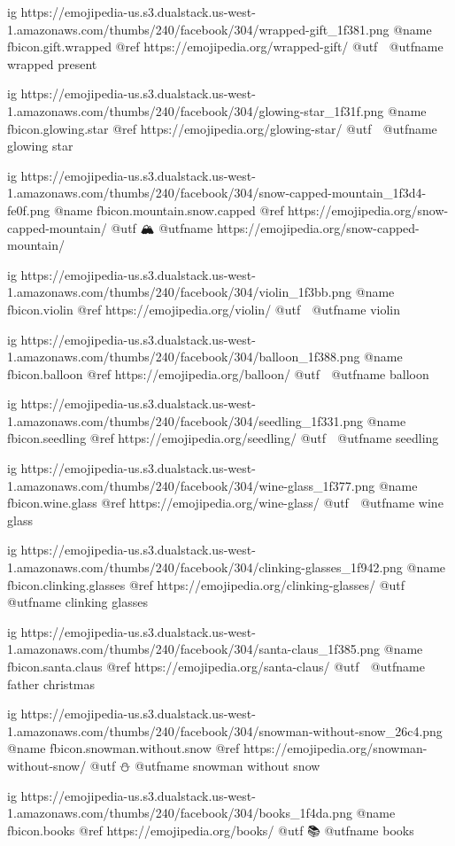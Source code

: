 	ig https://emojipedia-us.s3.dualstack.us-west-1.amazonaws.com/thumbs/240/facebook/304/wrapped-gift_1f381.png
	@name fbicon.gift.wrapped
	@ref https://emojipedia.org/wrapped-gift/
	@utf 🎁
	@utfname wrapped present

	ig https://emojipedia-us.s3.dualstack.us-west-1.amazonaws.com/thumbs/240/facebook/304/glowing-star_1f31f.png
	@name fbicon.glowing.star
	@ref https://emojipedia.org/glowing-star/
	@utf 🌟
	@utfname glowing star

	ig https://emojipedia-us.s3.dualstack.us-west-1.amazonaws.com/thumbs/240/facebook/304/snow-capped-mountain_1f3d4-fe0f.png
	@name fbicon.mountain.snow.capped
	@ref https://emojipedia.org/snow-capped-mountain/
	@utf 🏔
	@utfname https://emojipedia.org/snow-capped-mountain/

	ig https://emojipedia-us.s3.dualstack.us-west-1.amazonaws.com/thumbs/240/facebook/304/violin_1f3bb.png
	@name fbicon.violin
	@ref https://emojipedia.org/violin/
	@utf 🎻
	@utfname violin

	ig https://emojipedia-us.s3.dualstack.us-west-1.amazonaws.com/thumbs/240/facebook/304/balloon_1f388.png
	@name fbicon.balloon
	@ref https://emojipedia.org/balloon/
	@utf 🎈
	@utfname balloon

	ig https://emojipedia-us.s3.dualstack.us-west-1.amazonaws.com/thumbs/240/facebook/304/seedling_1f331.png
	@name fbicon.seedling
	@ref https://emojipedia.org/seedling/
	@utf 🌱
	@utfname seedling

	ig https://emojipedia-us.s3.dualstack.us-west-1.amazonaws.com/thumbs/240/facebook/304/wine-glass_1f377.png
	@name fbicon.wine.glass
	@ref https://emojipedia.org/wine-glass/
	@utf 🍷
	@utfname wine glass

	ig https://emojipedia-us.s3.dualstack.us-west-1.amazonaws.com/thumbs/240/facebook/304/clinking-glasses_1f942.png
	@name fbicon.clinking.glasses
	@ref https://emojipedia.org/clinking-glasses/
	@utf 🥂
	@utfname clinking glasses

	ig https://emojipedia-us.s3.dualstack.us-west-1.amazonaws.com/thumbs/240/facebook/304/santa-claus_1f385.png
	@name fbicon.santa.claus
	@ref https://emojipedia.org/santa-claus/
	@utf 🎅
	@utfname father christmas

	ig https://emojipedia-us.s3.dualstack.us-west-1.amazonaws.com/thumbs/240/facebook/304/snowman-without-snow_26c4.png
	@name fbicon.snowman.without.snow
	@ref https://emojipedia.org/snowman-without-snow/
	@utf ⛄
	@utfname snowman without snow

	ig https://emojipedia-us.s3.dualstack.us-west-1.amazonaws.com/thumbs/240/facebook/304/books_1f4da.png
	@name fbicon.books
	@ref https://emojipedia.org/books/
	@utf 📚
	@utfname books

